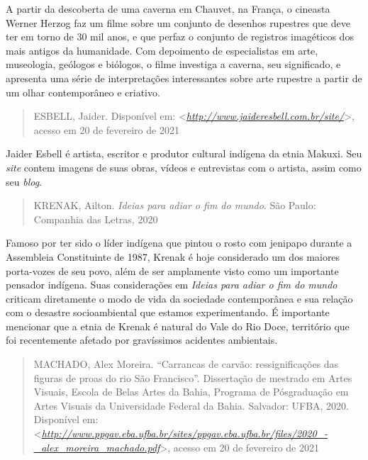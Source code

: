 \documentclass{extrarticle}
\begin{document}
    A partir da descoberta de uma caverna em Chauvet, na França, o
    cineasta Werner Herzog faz um filme sobre um conjunto de desenhos
    rupestres que deve ter em torno de 30 mil anos, e que perfaz o
    conjunto de registros imagéticos dos mais antigos da humanidade. Com
    depoimento de especialistas em arte, museologia, geólogos e
    biólogos, o filme investiga a caverna, seu significado, e apresenta
    uma série de interpretações interessantes sobre arte rupestre a
    partir de um olhar contemporâneo e criativo.

    \begin{quote}
    ESBELL, Jaider. Disponível em:
    \textless{}\href{http://www.jaideresbell.com.br/site/}{\emph{http://www.jaideresbell.com.br/site/}}\textgreater{},
    acesso em 20 de fevereiro de 2021
    \end{quote}

    Jaider Esbell é artista, escritor e produtor cultural indígena da
    etnia Makuxi. Seu \emph{site} contem imagens de suas obras, vídeos e
    entrevistas com o artista, assim como seu \emph{blog}.

    \begin{quote}
    KRENAK, Ailton. \emph{Ideias para adiar o fim do mundo}. São Paulo:
    Companhia das Letras, 2020
    \end{quote}

    Famoso por ter sido o líder indígena que pintou o rosto com jenipapo
    durante a Assembleia Constituinte de 1987, Krenak é hoje considerado
    um dos maiores porta-vozes de seu povo, além de ser amplamente visto
    como um importante pensador indígena. Suas considerações em
    \emph{Ideias para adiar o fim do mundo} criticam diretamente o modo
    de vida da sociedade contemporânea e sua relação com o desastre
    socioambiental que estamos experimentando. É importante mencionar
    que a etnia de Krenak é natural do Vale do Rio Doce, território que
    foi recentemente afetado por gravíssimos acidentes ambientais.

    \begin{quote}
    MACHADO, Alex Moreira. ``Carrancas de carvão: ressignificações das
    figuras de proas do rio São Francisco''. Dissertação de mestrado em
    Artes Visuais, Escola de Belas Artes da Bahia, Programa de
    Pósgraduação em Artes Visuais da Universidade Federal da Bahia.
    Salvador: UFBA, 2020. Disponível em:
    \textless{}\href{http://www.ppgav.eba.ufba.br/sites/ppgav.eba.ufba.br/files/2020_-_alex_moreira_machado.pdf}{\emph{http://www.ppgav.eba.ufba.br/sites/ppgav.eba.ufba.br/files/2020\_-\_alex\_moreira\_machado.pdf}}\textgreater{},
    acesso em 20 de fevereiro de 2021
    \end{quote}
\end{document}

